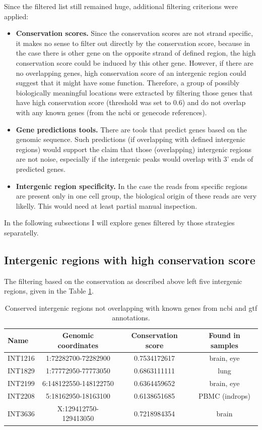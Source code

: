 Since the filtered list still remained huge, additional filtering criterions were applied:
\begin{itemize}
  \item \textbf{Conservation scores.} Since the conservation scores are not strand specific,
  it makes no sense to filter out directly by the conservation score, because in the case there is other gene on the opposite strand
  of defined region, the high conservation score could be induced by this other gene.
  However, if there are no overlapping genes, high conservation score of an intergenic region could suggest that it might have some function.
  Therefore, a group of possibly biologically meaningful locations were extracted by filtering those genes that have high conservation score
  (threshold was set to 0.6) and do not overlap with any known genes (from the ncbi or genecode references).
  \item \textbf{Gene predictions tools.} There are tools that predict genes based on the genomic sequence.
  Such predictions (if overlapping with defined intergenic regions) would support the claim that
  those (overlapping) intergenic regions are not noise, especially if the intergenic peaks would overlap with 3' ends of predicted genes.
  \item \textbf{Intergenic region specificity.} In the case the reads from specific regions are present only in one cell group,
  the biological origin of these reads are very likelly.
  This would need at least partial manual inspection.
\end{itemize}

In the following subsections I will explore genes filtered by those strategies separatelly.

\subsection{Intergenic regions with high conservation score}

The filtering based on the conservation as described above left five intergenic regions, given in the Table \ref{tab:conservedIntergenic}.

\begin{table}[h]
    \centering
    \begin{tabular}{lccc}
        \toprule
        Name & Genomic coordinates & Conservation score & Found in samples \\
        \midrule
        INT1216 & 1:72282700-72282900 & 0.7534172617 & brain, eye\\
	INT1829 & 1:77772950-77773050 & 0.6863111111 & lung \\
	INT2199 & 6:148122550-148122750 & 0.6364459652 & brain, eye \\
	INT2208 & 5:18162950-18163100 & 0.6138651685 & PBMC (indrops) \\
	INT3636 & X:129412750-129413050 & 0.7218984354 & brain \\
        \bottomrule
    \end{tabular}
    \caption{Conserved intergenic regions not overlapping with known genes from ncbi and gtf annotations.}
    \label{tab:conservedIntergenic}
\end{table}

